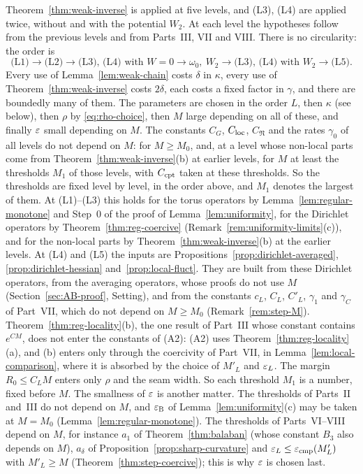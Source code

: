 Theorem~\ref{thm:weak-inverse} is applied at five levels, and (L3), (L4) are applied twice, without and with the potential $W_2$. At each level the hypotheses follow from the previous levels and from Parts~III, VII and VIII. There is no circularity: the order is
\[
\text{(L1)}\to\text{(L2)}\to\text{(L3), (L4) with }W=0\to\omega_0,\ W_2\to\text{(L3), (L4) with }W_2\to\text{(L5)}.
\]
Every use of Lemma~\ref{lem:weak-chain} costs $\delta$ in $\kappa$, every use of Theorem~\ref{thm:weak-inverse} costs $2\delta$, each costs a fixed factor in $\gamma$, and there are boundedly many of them. The parameters are chosen in the order $L$, then $\kappa$ (see below), then $\rho$ by \eqref{eq:rho-choice}, then $M$ large depending on all of these, and finally $\varepsilon$ small depending on $M$. The constants $C_G$, $C_{\rm loc}$, $C_{\mathfrak N}$ and the rates $\gamma_0$ of all levels do not depend on $M$: for $M\ge M_0$, and, at a level whose non-local parts come from Theorem~\ref{thm:weak-inverse}(b) at earlier levels, for $M$ at least the thresholds $M_1$ of those levels, with $C_{\rm cpt}$ taken at these thresholds. So the thresholds are fixed level by level, in the order above, and $M_1$ denotes the largest of them. At (L1)--(L3) this holds for the torus operators by Lemma~\ref{lem:regular-monotone} and Step~0 of the proof of Lemma~\ref{lem:uniformity}, for the Dirichlet operators by Theorem~\ref{thm:reg-coercive} (Remark~\ref{rem:uniformity-limits}(c)), and for the non-local parts by Theorem~\ref{thm:weak-inverse}(b) at the earlier levels. At (L4) and (L5) the inputs are Propositions~\ref{prop:dirichlet-averaged}, \ref{prop:dirichlet-hessian} and~\ref{prop:local-fluct}. They are built from these Dirichlet operators, from the averaging operators, whose proofs do not use $M$ (Section~\ref{sec:AB-proof}, Setting), and from the constants $c_L$, $C_L$, $C'_L$, $\gamma_1$ and $\gamma_C$ of Part~VII, which do not depend on $M\ge M_0$ (Remark~\ref{rem:step-M}). Theorem~\ref{thm:reg-locality}(b), the one result of Part~III whose constant contains $e^{CM}$, does not enter the constants of (A2): (A2) uses Theorem~\ref{thm:reg-locality}(a), and (b) enters only through the coercivity of Part~VII, in Lemma~\ref{lem:local-comparison}, where it is absorbed by the choice of $M'_L$ and $\varepsilon_L$. The margin $R_0\le C_LM$ enters only $\rho$ and the seam width. So each threshold $M_1$ is a number, fixed before $M$. The smallness of $\varepsilon$ is another matter. The thresholds of Parts~II and~III do not depend on $M$, and $\varepsilon_{\rm B}$ of Lemma~\ref{lem:uniformity}(c) may be taken at $M=M_0$ (Lemma~\ref{lem:regular-monotone}). The thresholds of Parts~VI--VIII depend on $M$, for instance $a_1$ of Theorem~\ref{thm:balaban} (whose constant $B_3$ also depends on $M$), $a_\delta$ of Proposition~\ref{prop:sharp-curvature} and $\varepsilon_L\le\varepsilon_{\rm cmp}(M'_L)$ with $M'_L\ge M$ (Theorem~\ref{thm:step-coercive}); this is why $\varepsilon$ is chosen last.

